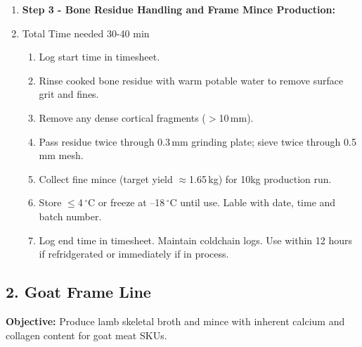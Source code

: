 \begin{enumerate}
  \item \textbf{Step 3 - Bone Residue Handling and Frame Mince Production:}
   \item Total Time needed 30-40 min 
    \begin{enumerate}
      \item Log start time in timesheet.
      \item Rinse cooked bone residue with warm potable water to remove surface grit and fines.
      \item Remove any dense cortical fragments ($>$10\,mm).
      \item Pass residue twice through 0.3\,mm grinding plate; sieve twice through 0.5\,mm mesh.
      \item Collect fine mince (target yield $\approx$1.65\,kg) for 10kg production run. 
      \item Store $\leq$4\,$^{\circ}$C or freeze at –18\,$^{\circ}$C until use. Lable with date, time and batch number.
      \item Log end time in timesheet.  Maintain coldchain  logs. Use within 12 hours if refridgerated or immediately if in process.
    \end{enumerate}
\end{enumerate}

\subsection*{2. Goat Frame Line}
\textbf{Objective:} Produce lamb skeletal broth and mince with inherent calcium and collagen content for goat meat SKUs.

